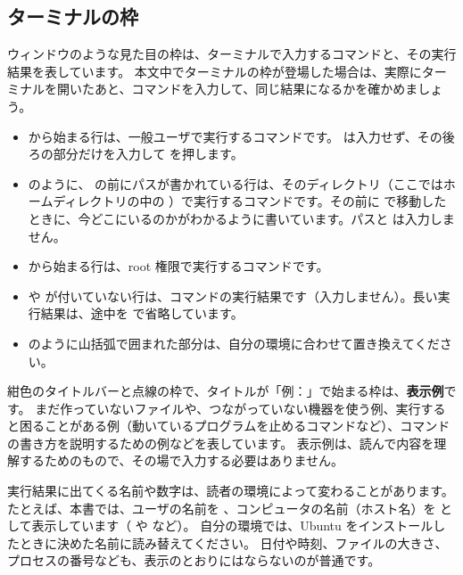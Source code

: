 \subsection*{ターミナルの枠}

ウィンドウのような見た目の枠は、ターミナルで入力するコマンドと、その実行結果を表しています。
本文中でターミナルの枠が登場した場合は、実際にターミナルを開いたあと、コマンドを入力して、同じ結果になるかを確かめましょう。


\begin{itemize}
  \item \cmd{\$} から始まる行は、一般ユーザで実行するコマンドです。\cmd{\$} は入力せず、その後ろの部分だけを入力して  を押します。
  \item {} のように、\cmd{\$} の前にパスが書かれている行は、そのディレクトリ（ここではホームディレクトリの中の ）で実行するコマンドです。その前に  で移動したときに、今どこにいるのかがわかるように書いています。パスと \cmd{\$} は入力しません。
  \item \cmd{\#} から始まる行は、root 権限で実行するコマンドです。
  \item \cmd{\$} や \cmd{\#} が付いていない行は、コマンドの実行結果です（入力しません）。長い実行結果は、途中を  で省略しています。
  \item {} のように山括弧で囲まれた部分は、自分の環境に合わせて置き換えてください。
\end{itemize}

紺色のタイトルバーと点線の枠で、タイトルが「例：」で始まる枠は、\textbf{表示例}です。
まだ作っていないファイルや、つながっていない機器を使う例、実行すると困ることがある例（動いているプログラムを止めるコマンドなど）、コマンドの書き方を説明するための例などを表しています。
表示例は、読んで内容を理解するためのもので、その場で入力する必要はありません。


実行結果に出てくる名前や数字は、読者の環境によって変わることがあります。
たとえば、本書では、ユーザの名前を 、コンピュータの名前（ホスト名）を  として表示しています（ や  など）。
自分の環境では、Ubuntu をインストールしたときに決めた名前に読み替えてください。
日付や時刻、ファイルの大きさ、プロセスの番号なども、表示のとおりにはならないのが普通です。


